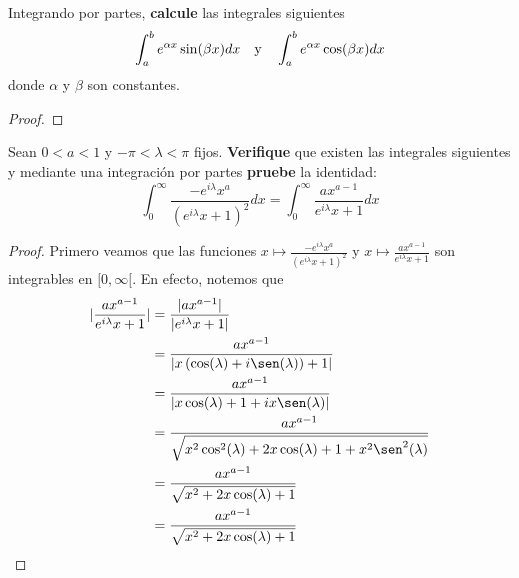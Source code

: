 \documentclass[12pt]{report}
\theoremstyle{largebreak}
\newcommand\abs[1]{\ensuremath{\lvert#1\rvert}}
\begin{document}
    \begin{excer}
        Integrando por partes, \textbf{calcule} las integrales siguientes
        \begin{equation*}
            \int_{a}^{b}e^{\alpha x}\sin(\beta x)dx\quad\textup{y}\quad\int_{a}^{b}e^{\alpha x}\cos(\beta x)dx
        \end{equation*}
        donde $\alpha$ y $\beta$ son constantes.
    \end{excer}

    \begin{proof}
        
    \end{proof}

    \begin{excer}
        Sean $0<a<1$ y $-\pi<\lambda<\pi$ fijos. \textbf{Verifique} que existen las integrales siguientes y mediante una integración por partes \textbf{pruebe} la identidad:
        \begin{equation*}
            \int_{0}^{\infty}\frac{-e^{i\lambda}x^a}{(e^{i\lambda}x+1)^2}dx=\int_{0}^{\infty}\frac{ax^{a-1}}{e^{i\lambda}x+1}dx
        \end{equation*}
    \end{excer}

    \begin{proof}
		Primero veamos que las funciones $x\mapsto \frac{-e^{i\lambda}x^a}{(e^{i\lambda}x+1)^2}$ y $x\mapsto \frac{ax^{a-1}}{e^{i\lambda}x+1}$ son integrables en $[0,\infty[$. En efecto, notemos que
		\begin{equation*}
			\begin{split}
				\abs{\frac{ax^{a-1}}{e^{i\lambda}x+1}}&=\frac{\abs{ax^{a-1}}}{\abs{e^{i\lambda}x+1}}\\
				&=\frac{ax^{a-1}}{\abs{x\left(\cos(\lambda)+i\sen(\lambda)\right)+1}}\\
				&=\frac{ax^{a-1}}{\abs{x\cos(\lambda)+1+ix\sen(\lambda)}}\\
				&=\frac{ax^{a-1}}{\sqrt{x^2\cos^{2}(\lambda)+2x\cos(\lambda)+1+x^2\sen^{2}(\lambda)}}\\
				&=\frac{ax^{a-1}}{\sqrt{x^2+2x\cos(\lambda)+1}}\\
                &=\frac{ax^{a-1}}{\sqrt{x^2+2x\cos(\lambda)+1}}\\
			\end{split}
		\end{equation*}
		
    \end{proof}
\end{document}
